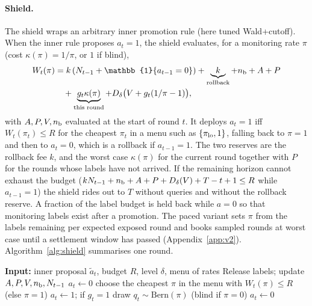 \documentclass{article}
\theoremstyle{plain}
\theoremstyle{definition}
\newcommand{\one}{\mathbb{1}}
\begin{document}
\paragraph{Shield.}
The shield wraps an arbitrary inner promotion rule (here tuned Wald+cutoff). When the inner rule proposes $a_t=1$, the shield evaluates, for a monitoring rate $\pi$ (cost $\kappa(\pi)=1/\pi$, or $1$ if blind),
{\small\begin{align*}
W_t(\pi)&=k\,(N_{t-1}+\one\{a_{t-1}=0\})+\underbrace{k}_{\text{rollback}}+n_{\rm b}+A+P\\
&\quad+\underbrace{g_t\kappa(\pi)}_{\text{this round}}+D_\delta\big(V+g_t(1/\pi-1)\big),
\end{align*}}
with $A,P,V,n_{\rm b}$ evaluated at the start of round $t$. It deploys $a_t=1$ iff $W_t(\pi_t)\le R$ for the cheapest $\pi_t$ in a menu such as $\{\pi_{\rm lo},1\}$, falling back to $\pi=1$ and then to $a_t=0$, which is a rollback if $a_{t-1}=1$. The two reserves are the rollback fee $k$, and the worst case $\kappa(\pi)$ for the current round together with $P$ for the rounds whose labels have not arrived. If the remaining horizon cannot exhaust the budget ($kN_{t-1}+n_{\rm b}+A+P+D_\delta(V)+T-t+1\le R$ while $a_{t-1}=1$) the shield rides out to $T$ without queries and without the rollback reserve. A fraction of the label budget is held back while $a=0$ so that monitoring labels exist after a promotion. The paced variant sets $\pi$ from the labels remaining per expected exposed round and books sampled rounds at worst case until a settlement window has passed (Appendix~\ref{app:v2}). Algorithm~\ref{alg:shield} summarises one round.

\begin{algorithm}[t]
\caption{One round of the risk-budget shield}\label{alg:shield}
\begin{algorithmic}
\STATE \textbf{Input:} inner proposal $\tilde a_t$, budget $R$, level $\delta$, menu of rates
\STATE Release labels; update $A,P,V,n_{\rm b},N_{t-1}$
 \STATE $a_t\leftarrow0$ 
\ELSE
  \STATE choose the cheapest $\pi$ in the menu with $W_t(\pi)\le R$ (else $\pi=1$)
   \STATE $a_t\leftarrow1$; if $g_t=1$ draw $q_t\sim\mathrm{Bern}(\pi)$ (blind if $\pi=0$)
  \ELSE \STATE $a_t\leftarrow0$ \ENDIF
\ENDIF
\end{algorithmic}
\end{algorithm}
\end{document}
